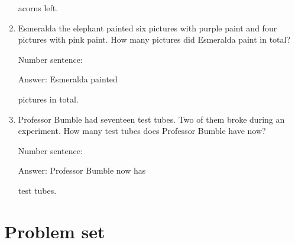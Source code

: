 \documentclass{tufte-book}
\begin{document}
\begin{enumerate}
  acorns left.
\item
  Esmeralda the elephant painted six pictures with purple paint and four
  pictures with pink paint. How many pictures did Esmeralda paint in
  total?\medskip\par
  Number sentence:
  \dotfill\medskip\par
  Answer: Esmeralda painted
  \dotfill\medskip\par\mbox{}\dotfill\medskip\par\mbox{}\dotfill\bigskip
  pictures in total.
\item
  Professor Bumble had seventeen test tubes. Two of them broke during an
  experiment. How many test tubes does Professor Bumble have now?\medskip\par
  Number sentence:
  \dotfill\medskip\par
  Answer: Professor Bumble now has
  \dotfill\medskip\par\mbox{}\dotfill\medskip\par\mbox{}\dotfill\bigskip
  test tubes.
\end{enumerate}



\clearpage\section{Problem set }
\end{document}
